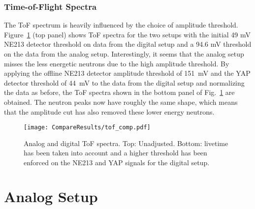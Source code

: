 \documentclass[main.tex]{subfiles}
\begin{document}
\subsubsection{Time-of-Flight Spectra}
The ToF spectrum is heavily influenced by the choice of amplitude threshold. Figure~\ref{fig:tof_comp} (top panel) shows ToF spectra for the two setups with the initial 49 mV NE213 detector threshold on data from the digital setup and a 94.6 mV threshold on the data from the analog setup. Interestingly, it seems that the analog setup misses the less energetic neutrons due to the high amplitude threshold. By applying the offline NE213 detector amplitude threshold of \SI{151}{mV} and the YAP detector threshold of \SI{44}{mV} to the data from the digital setup and normalizing the data as before, the ToF spectra shown in the bottom panel of Fig.~\ref{fig:tof_comp} are obtained. The neutron peaks now have roughly the same shape, which means that the amplitude cut has also removed these lower energy neutrons.

\begin{figure}[h]
    \centering
        \texttt{[image: CompareResults/tof\_comp.pdf]}
        \caption[Analog and digital ToF spectra.]{Analog and digital ToF spectra. Top: Unadjusted. Bottom: livetime has been taken into account and a higher threshold has been enforced on the NE213 and YAP signals for the digital setup.}
    \label{fig:tof_comp}
\end{figure}

\section{Analog Setup}
\end{document}
